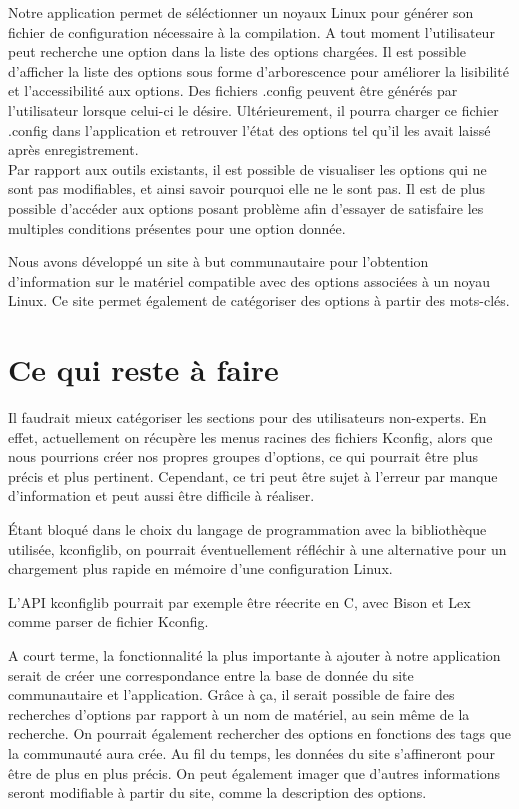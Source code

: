 \documentclass[17pts]{report}
\begin{document}
Notre application permet de séléctionner un noyaux Linux pour générer son
fichier de configuration nécessaire à la compilation. A tout moment
l'utilisateur peut recherche une option dans la liste des options chargées.  Il
est possible d'afficher la liste des options sous forme d'arborescence pour
améliorer la lisibilité et l'accessibilité aux options. Des fichiers .config
peuvent être générés par l'utilisateur lorsque celui-ci le désire.
Ultérieurement, il pourra charger ce fichier .config dans l'application et
retrouver l'état des options tel qu'il les avait laissé après enregistrement.\\

Par rapport aux outils existants, il est possible de visualiser les options qui
ne sont pas modifiables, et ainsi savoir pourquoi elle ne le sont pas.  Il est
de plus possible d'accéder aux options posant problème afin d'essayer de
satisfaire les multiples conditions présentes pour une option donnée.

Nous avons développé un site à but communautaire pour l'obtention d'information
sur le matériel compatible avec des options associées à un noyau Linux. Ce site
permet également de catégoriser des options à partir des mots-clés.

\section{Ce qui reste à faire}
\label{sec:Ce qui reste à faire}
Il faudrait mieux catégoriser les sections pour des utilisateurs non-experts.
En effet, actuellement on récupère les menus racines des fichiers Kconfig,
alors que nous pourrions créer nos propres groupes d'options, ce qui pourrait
être plus précis et plus pertinent. Cependant, ce tri peut être sujet à
l'erreur par manque d'information et peut aussi être difficile à réaliser.

Étant bloqué dans le choix du langage de programmation avec la bibliothèque
utilisée, kconfiglib, on pourrait éventuellement réfléchir à une alternative
pour un chargement plus rapide en mémoire d'une configuration Linux.

L'API kconfiglib pourrait par exemple être réecrite en C, avec Bison et Lex
comme parser de fichier Kconfig.

A court terme, la fonctionnalité la plus importante à ajouter à notre
application serait de créer une correspondance entre la base de donnée du site
communautaire et l'application. Grâce à ça, il serait possible de faire des
recherches d'options par rapport à un nom de matériel, au sein même de la
recherche. On pourrait également rechercher des options en fonctions des tags
que la communauté aura crée. Au fil du temps, les données du site s'affineront
pour être de plus en plus précis. On peut également imager que d'autres
informations seront modifiable à partir du site, comme la description des
options.
\end{document}
